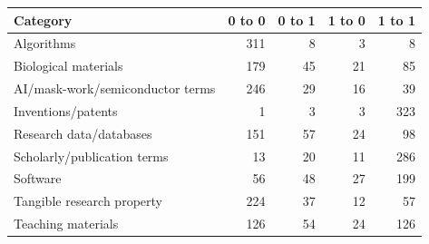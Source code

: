 \begin{tabular}{lrrrr}
\toprule
Category & 0 to 0 & 0 to 1 & 1 to 0 & 1 to 1 \\
\midrule
Algorithms & 311 & 8 & 3 & 8 \\
Biological materials & 179 & 45 & 21 & 85 \\
AI/mask-work/semiconductor terms & 246 & 29 & 16 & 39 \\
Inventions/patents & 1 & 3 & 3 & 323 \\
Research data/databases & 151 & 57 & 24 & 98 \\
Scholarly/publication terms & 13 & 20 & 11 & 286 \\
Software & 56 & 48 & 27 & 199 \\
Tangible research property & 224 & 37 & 12 & 57 \\
Teaching materials & 126 & 54 & 24 & 126 \\
\bottomrule
\end{tabular}
